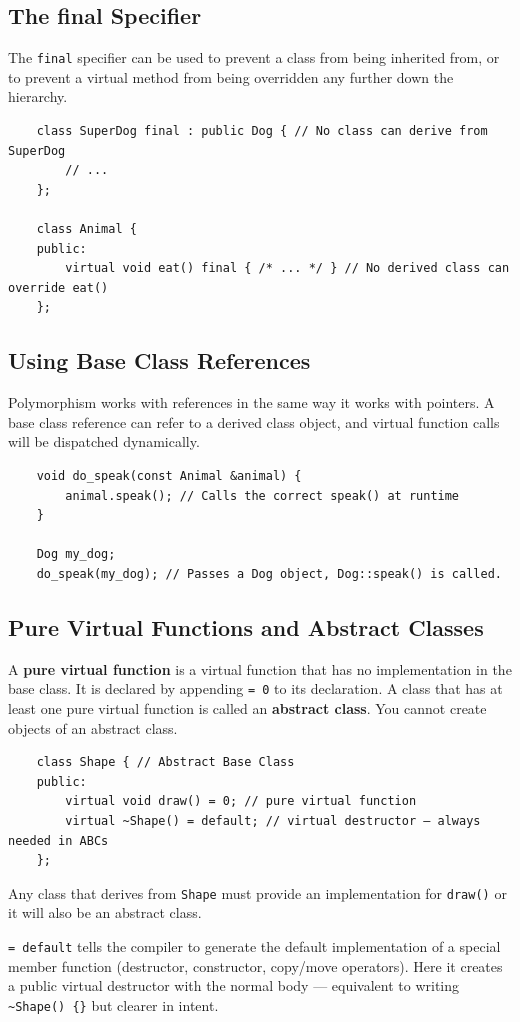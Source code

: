 \subsection{The final Specifier}
The \texttt{final} specifier can be used to prevent a class from being inherited from, or to prevent a virtual method from being overridden any further down the hierarchy.
\begin{lstlisting}
	class SuperDog final : public Dog { // No class can derive from SuperDog
		// ...
	};

	class Animal {
	public:
		virtual void eat() final { /* ... */ } // No derived class can override eat()
	};
\end{lstlisting}

\subsection{Using Base Class References}
Polymorphism works with references in the same way it works with pointers. A base class reference can refer to a derived class object, and virtual function calls will be dispatched dynamically.
\begin{lstlisting}
	void do_speak(const Animal &animal) {
		animal.speak(); // Calls the correct speak() at runtime
	}

	Dog my_dog;
	do_speak(my_dog); // Passes a Dog object, Dog::speak() is called.
\end{lstlisting}

\subsection{Pure Virtual Functions and Abstract Classes}
A \textbf{pure virtual function} is a virtual function that has no implementation in the base class. It is declared by appending \texttt{= 0} to its declaration. A class that has at least one pure virtual function is called an \textbf{abstract class}. You cannot create objects of an abstract class.
\begin{lstlisting}
	class Shape { // Abstract Base Class
	public:
		virtual void draw() = 0; // pure virtual function
		virtual ~Shape() = default; // virtual destructor — always needed in ABCs
	};
\end{lstlisting}
Any class that derives from \texttt{Shape} must provide an implementation for \texttt{draw()} or it will also be an abstract class.

\begin{remark}
	\texttt{= default} tells the compiler to generate the default implementation of a special member function (destructor, constructor, copy/move operators). Here it creates a public virtual destructor with the normal body — equivalent to writing \texttt{\textasciitilde Shape() \{\}} but clearer in intent.
\end{remark}


